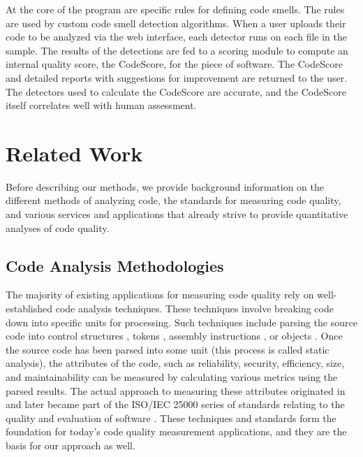 \documentclass{sig-alternate}
\begin{document}
At the core of the program are specific rules for defining code
smells. The rules are used by custom code smell detection algorithms. When a
user uploads their code to be analyzed via the web interface, each detector runs on each file in the
sample. The results of the detections are fed to a scoring module to compute an
internal quality score, the CodeScore, for the piece of software. The CodeScore
and detailed reports with suggestions for improvement are returned to the user.
The detectors used to calculate the CodeScore are accurate, and the CodeScore
itself correlates well with human assessment.

\section{Related Work}
\label{sec:related_work}
Before describing our methods, we provide background information
on the different methods of analyzing code, the standards for measuring code
quality, and various services and applications that already strive to provide
quantitative analyses of code quality.

\subsection{Code Analysis Methodologies}
The majority of existing applications for measuring code quality rely on
well-established code analysis techniques. These techniques involve breaking
code down into specific units for processing. Such
techniques include parsing the source code into control structures
\cite{mccabe1976complexity}, tokens \cite{halstead1977elements}, assembly
instructions \cite{park1992software}, or objects \cite{chidamber1994metrics}.
Once the source code has been parsed into some unit (this process is called
static analysis), the attributes of the code, such as reliability, security,
efficiency, size, and maintainability can be measured by calculating various
metrics using the parsed results.
The actual approach to measuring these attributes originated in~\cite{boehm1976quantitative}
and later became part of the ISO/IEC 25000 series
of standards relating to the quality and evaluation of software
\cite{iso2011iec}. These techniques and standards form the foundation for
today's code quality measurement applications, and they are the basis for our
approach as well.
\end{document}
